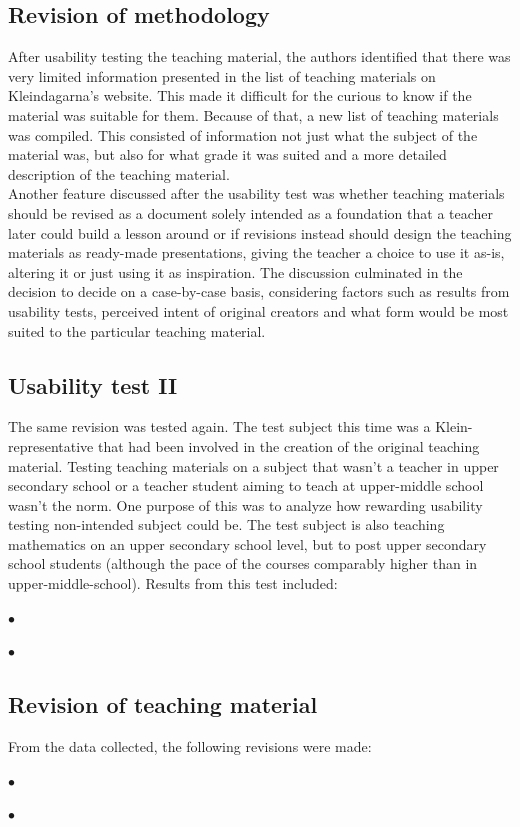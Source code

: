 \subsection{Revision of methodology}
After usability testing the teaching material, the authors identified that there was very limited information presented in the list of teaching materials on Kleindagarna's website. This made it difficult for the curious to know if the material was suitable for them. Because of that, a new list of teaching materials was compiled. This consisted of information not just what the subject of the material was, but also for what grade it was suited and a more detailed description of the teaching material.\\
Another feature discussed after the usability test was whether teaching materials should be revised as a document solely intended as a foundation that a teacher later could build a lesson around or if revisions instead should design the teaching materials as ready-made presentations, giving the teacher a choice to use it as-is, altering it or just using it as inspiration. The discussion culminated in the decision to decide on a case-by-case basis, considering factors such as results from usability tests, perceived intent of original creators and what form would be most suited to the particular teaching material.
\subsection{Usability test II}
The same revision was tested again. The test subject this time was a Klein-representative that had been involved in the creation of the original teaching material. Testing teaching materials on a subject that wasn't a teacher in upper secondary school or a teacher student aiming to teach at upper-middle school wasn't the norm. One purpose of this was to analyze how rewarding usability testing non-intended subject could be. The test subject is also teaching mathematics on an upper secondary school level, but to post upper secondary school students (although the pace of the courses comparably higher than in upper-middle-school). Results from this test included:
\begin{description}
    \item $\bullet$
    \item $\bullet$
\end{description}
\subsection{Revision of teaching material}
From the data collected, the following revisions were made:
\begin{description}
    \item $\bullet$
    \item $\bullet$
\end{description}
